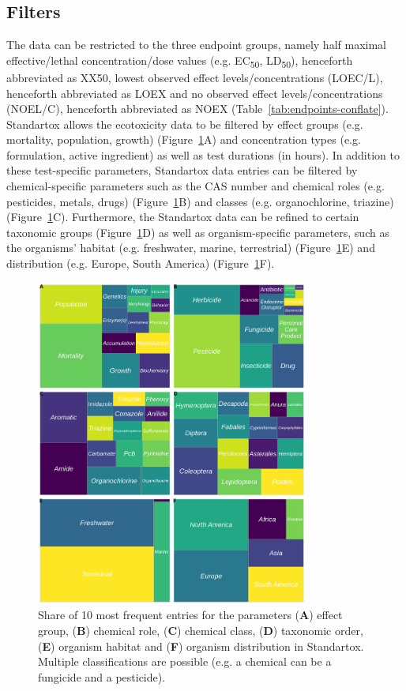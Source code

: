 \documentclass[journal,datadescriptor,accept,moreauthors,pdftex]{Definitions/mdpi}
\begin{document}
\subsection{Filters}
The data can be restricted to the three endpoint groups, namely half maximal effective/lethal concentration/dose values (e.g. EC\textsubscript{50}, LD\textsubscript{50}), henceforth abbreviated as XX50, lowest observed effect levels/concentrations (LOEC/L), henceforth abbreviated as LOEX and no observed effect levels/concentrations (NOEL/C), henceforth abbreviated as NOEX (Table~\ref{tab:endpoints-conflate}). Standartox allows the ecotoxicity data to be filtered by effect groups (e.g. mortality, population, growth) (Figure~\ref{fig:stx-parameters}A) and concentration types (e.g. formulation, active ingredient) as well as test durations (in hours). In addition to these test-specific parameters, Standartox data entries can be filtered by chemical-specific parameters such as the CAS number and chemical roles (e.g. pesticides, metals, drugs) (Figure~\ref{fig:stx-parameters}B) and classes (e.g. organochlorine, triazine) (Figure~\ref{fig:stx-parameters}C). Furthermore, the Standartox data can be refined to certain taxonomic groups (Figure~\ref{fig:stx-parameters}D) as well as organism-specific parameters, such as the organisms' habitat (e.g. freshwater, marine, terrestrial) (Figure~\ref{fig:stx-parameters}E) and distribution (e.g. Europe, South America) (Figure~\ref{fig:stx-parameters}F).

\begin{figure}[H]
    \centering
    \includegraphics[width=0.8\textwidth]{article/figures/standartox_parameters.png}
    \caption{Share of 10 most frequent entries for the parameters (\textbf{A}) effect group, (\textbf{B}) chemical role, (\textbf{C}) chemical class, (\textbf{D}) taxonomic order, (\textbf{E}) organism habitat and (\textbf{F}) organism distribution in Standartox. Multiple classifications are possible (e.g. a chemical can be a fungicide and a pesticide).}
    \label{fig:stx-parameters}
\end{figure}
\end{document}
